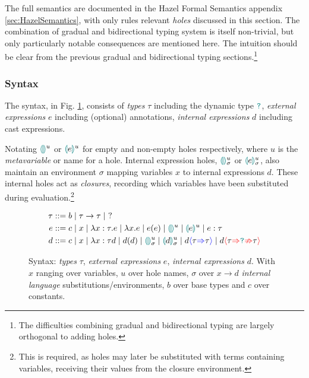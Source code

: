 The full semantics are documented in the Hazel Formal Semantics appendix \ref{sec:HazelSemantics}, with only rules relevant \textit{holes} discussed in this section. The combination of gradual and bidirectional typing system is itself non-trivial, but only particularly notable consequences are mentioned here. The intuition should be clear from the previous gradual and bidirectional typing sections.\footnote{The difficulties combining gradual and bidirectional typing are largely orthogonal to adding holes.}

\subsubsection{Syntax}\label{sec:HazelSyntax}
\par The syntax, in Fig. \ref{fig:syntax}, consists of \textit{types} $\tau$ including the dynamic type $\dyn$, \textit{external expressions} $e$ including (optional) annotations, \textit{internal expressions} $d$ including cast expressions.

Notating $\hole{}^u$ or $\hole[e]^u$ for empty and non-empty holes respectively, where $u$ is the \textit{metavariable} or name for a hole. Internal expression holes, $\hole{}^u_\sigma$ or $\hole[e]^u_\sigma$, also maintain an environment $\sigma$ mapping variables $x$ to internal expressions $d$. These internal holes act as \textit{closures}, recording which variables have been substituted during evaluation.\footnote{This is required, as holes may later be substituted with terms containing variables, receiving their values from the closure environment.}
\begin{figure}[h]
\begin{align*}
\tau &::= b \mid \tau \to \tau \mid\  ?\\
e &::= c \mid x \mid \lambda x : \tau.e \mid \lambda x. e \mid e(e) \mid \hole^u \mid \hole[e]^u \mid e : \tau\\
d &::= c \mid x \mid \lambda x : \tau d \mid d(d) \mid \hole^u_\sigma \mid \hole[d]^u_\sigma \mid d\scast{\tau}{\tau} \mid d\scasterror{\tau}{\tau}
\end{align*}
\caption{Syntax: \textit{types} $\tau$, \textit{external expressions} $e$, \textit{internal expressions} $d$. With $x$ ranging over variables, $u$ over hole names, $\sigma$ over $x \to d$ \textit{internal language} substitutions/environments, $b$ over base types and $c$ over constants.}
\label{fig:syntax}
\end{figure}


